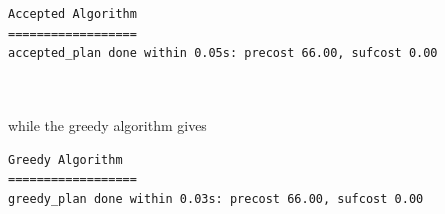 \begin{minipage}{\textwidth}
\begingroup
\fontsize{9pt}{12pt}\selectfont
\begin{lstlisting}
Accepted Algorithm
==================
accepted_plan done within 0.05s: precost 66.00, sufcost 0.00
\end{lstlisting}
\endgroup
\end{minipage} \\ \\


while the greedy algorithm gives \\


\begin{minipage}{\textwidth}
\begingroup
\fontsize{9pt}{12pt}\selectfont
\begin{lstlisting}
Greedy Algorithm
==================
greedy_plan done within 0.03s: precost 66.00, sufcost 0.00
\end{lstlisting}
\endgroup
\end{minipage} \\ \\


